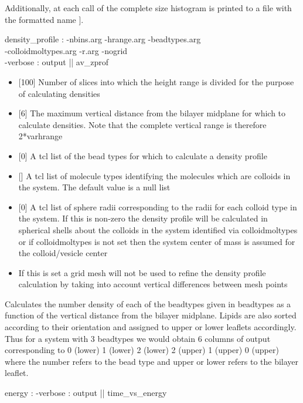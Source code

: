 Additionally, at each call of  the complete size histogram is printed to a file with the formatted name \codebox{sizehisto.[format \%05d \$time}].

\begin{code}
   density_profile  :  -nbins.arg -hrange.arg -beadtypes.arg \\
                     -colloidmoltypes.arg -r.arg -nogrid\\
                     -verbose  : output ||  av_zprof
\end{code}
\begin{itemize}
    \item {} [100] Number of slices into which the height range is divided for the purpose of calculating densities
    \item {} [6] The maximum vertical distance from the bilayer midplane for which to calculate densities. Note that the complete vertical range is therefore 2*var{hrange}
    \item {} [0] A tcl list of the bead types for which to calculate a density profile
    \item {} [] A tcl list of molecule types identifying the molecules which are colloids in the system. The default value is a null list
    \item {} [0] A tcl list of sphere radii corresponding to the radii for each colloid type in the system. If this is non-zero the density profile will be calculated in spherical shells about the colloids in the system identified via colloidmoltypes or if colloidmoltypes is not set then the system center of mass is assumed for the colloid/vesicle center
    \item {} If this is set a grid mesh will not be used to refine the density profile calculation by taking into account vertical differences between mesh points
\end{itemize}
Calculates the number density of each of the beadtypes given in beadtypes as a function of the vertical distance from the bilayer midplane. Lipids are also sorted according to their orientation and assigned to upper or lower leaflets accordingly. Thus for a system with 3 beadtypes we would obtain 6 columns of output corresponding to 0 (lower) 1 (lower) 2 (lower) 2 (upper) 1 (upper) 0 (upper) where the number refers to the bead type and upper or lower refers to the bilayer leaflet.
\begin{code}
  energy : -verbose : output || time_vs_energy
\end{code}
